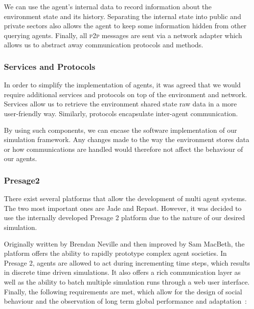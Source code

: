 We can use the agent's internal data to record information about the environment state and its history. Separating the internal state into public and private sectors also allows the agent to keep some information hidden from other querying agents. Finally, all \textsc{p2p} messages are sent via a network adapter which allows us to abstract away communication protocols and methods.

\subsubsection{Services and Protocols}

In order to simplify the implementation of agents, it was agreed that we would require additional services and protocols on top of the environment and network. Services allow us to retrieve the environment shared state raw data in a more user-friendly way. Similarly, protocols encapsulate inter-agent communication.

By using such components, we can encase the software implementation of our simulation framework. Any changes made to the way the environment stores data or how communications are handled would therefore not affect the behaviour of our agents.

\subsubsection{Presage2}

There exist several platforms that allow the development of multi agent systems. The two most important ones are Jade and Repast. However, it was decided to use the internally developed Presage 2 platform due to the nature of our desired simulation.

Originally written by Brendan Neville and then improved by Sam MacBeth, the platform offers the ability to rapidly prototype complex agent societies. In Presage 2, agents are allowed to act during incrementing time steps, which results in discrete time driven simulations. It also offers a rich communication layer as well as the ability to batch multiple simulation runs through a web user interface. Finally, the following requirements are met, which allow for the design of social behaviour and the observation of long term global performance and adaptation~\cite{Presage2-agent-societies}:

